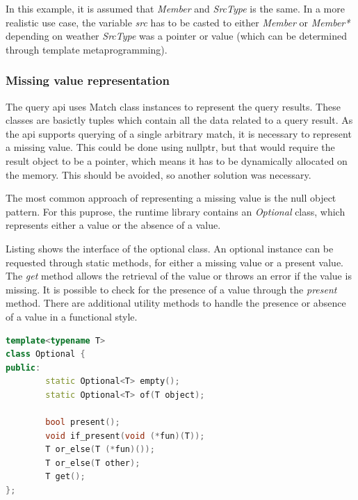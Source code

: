 In this example, it is assumed that \emph{Member} and \emph{SrcType} is the
same. In a more realistic use case, the variable \emph{src} has to be casted to
either \emph{Member} or \emph{Member*} depending on weather \emph{SrcType} was a
pointer or value (which can be determined through template metaprogramming).

\subsubsection{Missing value representation}
\label{sect:MissingValueRepresentation}

The query api uses Match class instances to represent the query results. These
classes are basictly tuples which contain all the data related to a query
result. As the api supports querying of a single arbitrary match, it is
necessary to represent a missing value. This could be done using nullptr, but
that would require the result object to be a pointer, which means it has to be
dynamically allocated on the memory. This should be avoided, so another solution
was necessary.

The most common approach of representing a missing value is the null object
pattern. For this puprose, the runtime library contains an \emph{Optional}
class, which represents either a value or the absence of a value.

Listing  shows the interface of the optional class. An
optional instance can be requested through static methods, for either a missing
value or a present value. The \emph{get} method allows the retrieval of the
value or throws an error if the value is missing. It is possible to check for
the presence of a value through the \emph{present} method. There are additional
utility methods to handle the presence or absence of a value in a functional
style.

\begin{lstlisting}[frame=single,float=!ht,language=C++,label=listing:optional,
caption=Optional interface] 
template<typename T>
class Optional {
public:
        static Optional<T> empty();
        static Optional<T> of(T object);

        bool present();
        void if_present(void (*fun)(T));
        T or_else(T (*fun)());
        T or_else(T other);
        T get();
};
\end{lstlisting}

